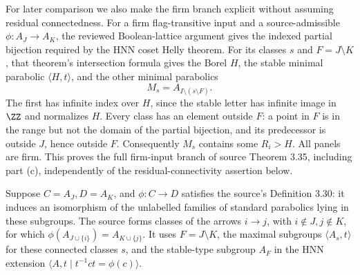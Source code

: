 For later comparison we also make the firm branch explicit without
assuming residual connectedness. For a firm flag-transitive input
and a source-admissible $\phi:A_J\to A_K$,
the reviewed Boolean-lattice argument gives the indexed partial
bijection required by the HNN coset Helly theorem. For its classes
$s$ and $F=J\setminus K$, that theorem's intersection formula gives
the Borel $H$, the stable minimal parabolic $\langle H,t\rangle$,
and the other minimal parabolics
\[
 M_s=A_{I\setminus(s\setminus F)}.
\]
The first has infinite index over $H$, since the stable letter has
infinite image in $\ZZ$ and normalizes $H$. Every class has an
element outside $F$: a point in $F$ is in the range but not the
domain of the partial bijection, and its predecessor is outside
$J$, hence outside $F$. Consequently $M_s$ contains some
$R_i>H$. All panels are firm. This proves the full firm-input branch
of source Theorem 3.35, including part (c), independently of the
residual-connectivity assertion below.

Suppose $C=A_J,D=A_K$, and $\phi:C\to D$ satisfies the source's
Definition 3.30: it induces an isomorphism of the unlabelled families
of standard parabolics lying in these subgroups. The source forms
classes of the arrows $i\to j$, with $i\notin J,j\notin K$, for
which $\phi(A_{J\cup\{i\}})=A_{K\cup\{j\}}$. It uses
$F=J\setminus K$, the maximal subgroups $\langle A_s,t\rangle$
for these connected classes $s$, and the stable-type subgroup $A_F$
in the HNN extension $\langle A,t\mid t^{-1}ct=\phi(c)\rangle$.

